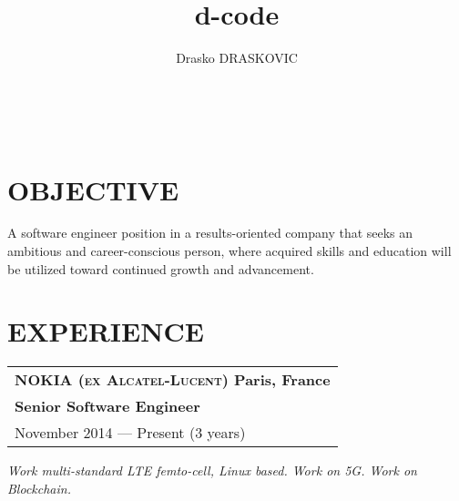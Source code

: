 \documentclass[a4paper, oneside, final]{scrartcl}
\title{d-code}
\author{Drasko DRASKOVIC}
\begin{document}

\titleformat{\section}{\large\scshape\raggedright}{}{0em}{}[\titlerule]

\begin{center}

   \textsc{\huge{}}

   \\

\end{center}

\section{OBJECTIVE}
   A software engineer position in a results-oriented company that seeks an
   ambitious and career-conscious person, where acquired skills and education
   will be utilized toward continued growth and advancement.

\section{EXPERIENCE}

\newcommand{\gray}{\rowcolor[gray]{.90}}
   \begin{tabularx}{1.0\linewidth}{X}
	   \gray \bfseries\textsc{\large{NOKIA (ex Alcatel-Lucent)}} \normalfont\hfill Paris, France\\
      \gray \bfseries{Senior Software Engineer}\\
      \gray November 2014 --- Present (3 years) \\
   \end{tabularx}

\medskip

   \textit{Work multi-standard LTE femto-cell, Linux based. Work on 5G. Work on Blockchain.}
\end{document}
